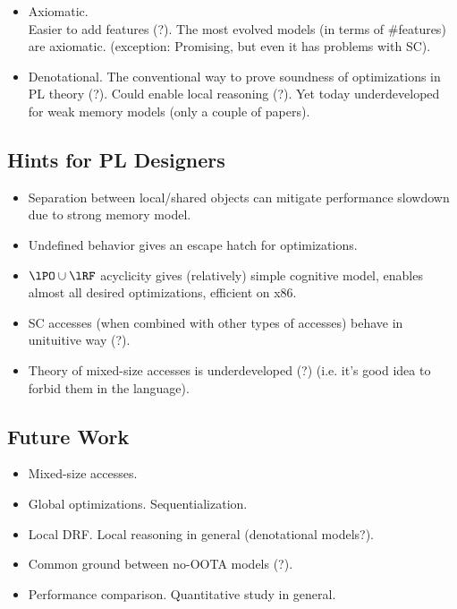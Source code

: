 \begin{itemize}
  \item Axiomatic. \\
    Easier to add features (?). 
    The most evolved models (in terms of \#features) are axiomatic.
    (exception: Promising, but even it has problems with SC).
  \item Denotational.
    The conventional way to prove soundness of optimizations in PL theory (?). 
    Could enable local reasoning (?).
    Yet today underdeveloped for weak memory models (only a couple of papers).
\end{itemize}

\subsection{Hints for PL Designers}
 
\begin{itemize}
  \item Separation between local/shared objects can mitigate
        performance slowdown due to strong memory model.
  \item Undefined behavior gives an escape hatch for optimizations.
  \item $\lPO \cup \lRF$ acyclicity gives (relatively) simple 
        cognitive model, enables almost all desired optimizations, efficient on x86.
  \item SC accesses (when combined with other types of accesses) behave in unituitive way (?).
  \item Theory of mixed-size accesses is underdeveloped (?)
        (i.e. it's good idea to forbid them in the language).
\end{itemize}

\subsection{Future Work}

\begin{itemize}
  \item Mixed-size accesses.
  \item Global optimizations. Sequentialization.
  \item Local DRF. Local reasoning in general (denotational models?).
  \item Common ground between no-OOTA models (?). 
  \item Performance comparison. Quantitative study in general.
\end{itemize}